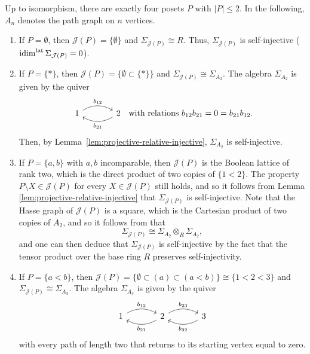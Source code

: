 \documentclass[a4paper,leqno]{amsart}
\begin{document}
\begin{eg}\label{eg:posets-at-most-two-elements}
Up to isomorphism, there are exactly four posets $P$ with $|P|\leq2$. In the following, $A_n$ denotes the path graph on $n$ vertices.
\begin{enumerate}
\item If $P=\emptyset$, then $\mathcal J(P)=\{\emptyset\}$ and $\Sigma_{\mathcal J(P)}\cong R$.  Thus, $\Sigma_{\mathcal{J}(P)}$ is self-injective ($\operatorname{idim}^{\operatorname{lat}} \Sigma_{\mathcal{J}(P)}=0$).

\item If $P=\{\ast\}$, then $\mathcal J(P)=\{\emptyset \subset \{\ast\}\}$ and $\Sigma_{\mathcal J(P)}\cong\Sigma_{A_2}$. The algebra $\Sigma_{A_2}$ is given by the quiver
\[
\begin{tikzcd}[column sep=large]
{1} & {2}
\arrow["{b_{12}}", from=1-1, to=1-2, bend left]
\arrow["{b_{21}}", from=1-2, to=1-1, bend left]
\end{tikzcd} \;\; \text{with relations } b_{12}b_{21}=0=b_{21}b_{12}.
\]
Then, by Lemma~\ref{lem:projective-relative-injective}, $\Sigma_{A_2}$ is self-injective.

\item If $P=\{a,b\}$ with $a,b$ incomparable, then $\mathcal J(P)$ is the Boolean lattice of rank two, which is the direct product of two copies of $\{1<2\}$.  The property $P\setminus X\in\mathcal J(P)$ for every $X\in\mathcal J(P)$ still holds, and so it follows from Lemma \ref{lem:projective-relative-injective} that $\Sigma_{\mathcal{J}(P)}$ is self-injective.
Note that the Hasse graph of $\mathcal{J}(P)$ is a square, which is the Cartesian product of two copies of $A_2$, and so it follows from \cite[Proposition~3.2]{CX26} that
\[
\Sigma_{\mathcal J(P)}\cong\Sigma_{A_2}\otimes_R\Sigma_{A_2},
\]
and one can then deduce that $\Sigma_{\mathcal{J}(P)}$ is self-injective by the fact that the tensor product over the base ring $R$ preserves self-injectivity.

\item If $P=\{a<b\}$, then $\mathcal J(P)=\{\emptyset \subset (a)\subset (a<b)\}\cong \{1<2<3\}$ and $\Sigma_{\mathcal J(P)}\cong\Sigma_{A_3}$. The algebra $\Sigma_{A_3}$ is given by the quiver
\[
\begin{tikzcd}[column sep=large]
{1} & {2} & {3}
\arrow["{b_{12}}", from=1-1, to=1-2, bend left]
\arrow["{b_{21}}", from=1-2, to=1-1, bend left]
\arrow["{b_{23}}", from=1-2, to=1-3, bend left]
\arrow["{b_{32}}", from=1-3, to=1-2, bend left]
\end{tikzcd}
\]
with every path of length two that returns to its starting vertex equal to zero.


\end{enumerate}
\end{eg}
\end{document}
